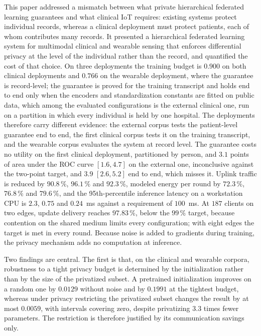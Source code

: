 This paper addressed a mismatch between what private hierarchical federated
learning guarantees and what clinical IoT requires: existing systems protect
individual records, whereas a clinical deployment must protect patients, each
of whom contributes many records. It presented a hierarchical federated
learning system for multimodal clinical and wearable sensing that enforces
differential privacy at the level of the individual rather than the record,
and quantified the cost of that choice. On three deployments the training budget is $0.900$ on both clinical
deployments and $0.766$ on the wearable deployment, where the guarantee is
record-level; the guarantee is proved for the training transcript and holds
end to end only when the encoders and standardization constants are fitted on
public data, which among the evaluated configurations is the external clinical
one, run on a partition in which every individual is held by one hospital. The
deployments therefore carry different evidence: the external corpus
tests the patient-level guarantee end to end,
the first clinical corpus tests
it on the training transcript, and the wearable corpus evaluates the system at
record level. The guarantee
costs no utility on the first clinical deployment, partitioned by person, and $3.1$ points
of area under the ROC curve $[1.6, 4.7]$ on the external one, inconclusive
against the two-point target, and $3.9$ $[2.6, 5.2]$ end to end, which misses
it. Uplink traffic is reduced
by $90.8\,\%$, $96.1\,\%$ and $92.3\,\%$, modeled energy per round by
$72.3\,\%$, $76.8\,\%$ and $79.6\,\%$, and the 95th-percentile inference
latency on a workstation CPU is $2.3$, $0.75$ and $0.24$~ms against a requirement of $100$~ms. At $187$
clients on two edges, update delivery reaches $97.83\,\%$, below the $99\,\%$
target, because contention on the shared medium limits every configuration;
with eight edges the target is met in every round. Because noise is added to gradients during training,
the privacy mechanism adds no computation at inference.

Two findings are central. The first is that, on the clinical and wearable corpora, robustness to a tight
privacy budget is determined by the initialization rather than by the size of the privatized
subset. A pretrained initialization improves on a random one by $0.0129$
without noise and by $0.1991$ at the tightest budget, whereas under privacy
restricting the privatized subset changes the result by at most $0.0059$, with
intervals covering zero,
despite privatizing $3.3$ times fewer parameters. The restriction is therefore
justified by its communication savings only.


